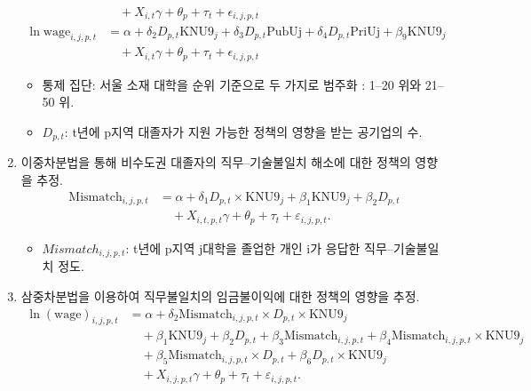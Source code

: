 \documentclass[aspectratio=169,xcolor=dvipsnames,handout]{beamer}
\begin{document}
\begin{frame}[allowframebreaks]
\begin{enumerate}[<+->]
\begin{align}
                    &\quad + X_{i,t} \gamma + \theta_p + \tau_t + \epsilon_{i,j,p,t} \\
                \ln{\text{wage}}_{i,j,p,t} &= \alpha + \delta_2 D_{p,t} \text{KNU9}_j + \delta_3 D_{p,t} \text{PubUj} 
                    + \delta_4 D_{p,t} \text{PriUj} + \beta_9 \text{KNU9}_j \\
                    &\quad + X_{i,t} \gamma + \theta_p + \tau_t + \epsilon_{i,j,p,t} \nonumber
            \end{align}
            \begin{itemize}[<+->]
                \item 통제 집단: 서울 소재 대학을 순위 기준으로 두 가지로 범주화 : 1–20 위와 21–50 위.
                \item $D_{p,t}$: t년에 p지역 대졸자가 지원 가능한 정책의 영향을 받는 공기업의 수.
            \end{itemize}
    \framebreak%
        \item 이중차분법을 통해 비수도권 대졸자의 직무--기술불일치 해소에 대한 정책의 영향을 추정.%
            \begin{align}
                \text{Mismatch}_{i,j,p,t} &= \alpha + \delta_{1} D_{p,t} \times \text{KNU9}_{j} + \beta_{1} \text{KNU9}_{j} + \beta_{2} D_{p,t} \\
                &\quad + X_{i,t,p,t}\gamma + \theta_{p} + \tau_{t} + \varepsilon_{i,j,p,t}. \nonumber
            \end{align}
            \begin{itemize}[<+->]
                \item $Mismatch_{i,j,p,t}$: t년에 p지역 j대학을 졸업한 개인 i가 응답한 직무--기술불일치 정도.
            \end{itemize}
    \framebreak%
        \item 삼중차분법을 이용하여 직무불일치의 임금불이익에 대한 정책의 영향을 추정. 
            \begin{align}
                \ln(\text{wage})_{i,j,p,t} &= \alpha 
                + \delta_{2} \text{Mismatch}_{i,j,p,t} \times D_{p,t} \times \text{KNU9}_{j} \\ \nonumber
                &\quad + \beta_{1}\text{KNU9}_{j} 
                + \beta_{2}D_{p,t} 
                + \beta_{3}\text{Mismatch}_{i,j,p,t} 
                + \beta_{4}\text{Mismatch}_{i,j,p,t} \times \text{KNU9}_{j} \\ \nonumber
                &\quad + \beta_{5}\text{Mismatch}_{i,j,p,t} \times D_{p,t} 
                + \beta_{6}D_{p,t} \times \text{KNU9}_{j}  \\ \nonumber
                &\quad + X_{i,j,p,t}\gamma 
                + \theta_{p} + \tau_{t} + \varepsilon_{i,j,p,t}.
            \end{align}
    \end{enumerate}
\end{frame}
\end{document}
